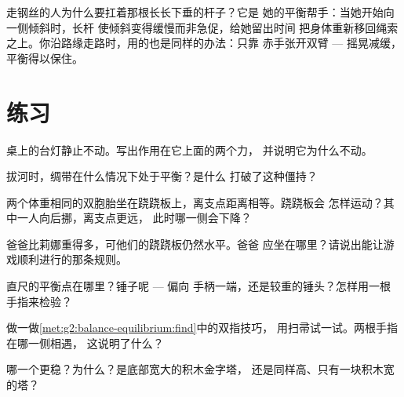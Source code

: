 \begin{example}[走钢丝者的长杆]\label{ex:g2:balance-equilibrium:acrobat}
走钢丝的人为什么要扛着那根长长下垂的杆子？它是
她的平衡帮手：当她开始向一侧倾斜时，长杆
使倾斜变得缓慢而非急促，给她留出时间
把身体重新移回绳索之上。你沿路缘走路时，用的也是同样的办法：只靠
赤手张开双臂 --- 摇晃减缓，
平衡得以保住。
\end{example}

\section{练习}

\begin{exercise}[$\star$]\label{exo:g2:balance-equilibrium:1}
桌上的台灯静止不动。写出作用在它上面的两个力，
并说明它为什么不动。
\end{exercise}

\begin{exercise}[$\star$]\label{exo:g2:balance-equilibrium:2}
拔河时，绸带在什么情况下处于平衡？是什么
打破了这种僵持？
\end{exercise}

\begin{exercise}[$\star$]\label{exo:g2:balance-equilibrium:3}
两个体重相同的双胞胎坐在跷跷板上，离支点距离相等。跷跷板会
怎样运动？其中一人向后挪，离支点更远，
此时哪一侧会下降？
\end{exercise}

\begin{exercise}[$\star$]\label{exo:g2:balance-equilibrium:4}
爸爸比莉娜重得多，可他们的跷跷板仍然水平。爸爸
应坐在哪里？请说出能让游戏顺利进行的那条规则。
\end{exercise}

\begin{exercise}[$\star$]\label{exo:g2:balance-equilibrium:5}
直尺的平衡点在哪里？锤子呢 --- 偏向
手柄一端，还是较重的锤头？怎样用一根
手指来检验？
\end{exercise}

\begin{exercise}[$\star$]\label{exo:g2:balance-equilibrium:6}
做一做\cref{met:g2:balance-equilibrium:find}中的双指技巧，
用扫帚试一试。两根手指在哪一侧相遇，
这说明了什么？
\end{exercise}

\begin{exercise}[$\star$]\label{exo:g2:balance-equilibrium:7}
哪一个更稳？为什么？是底部宽大的积木金字塔，
还是同样高、只有一块积木宽的塔？
\end{exercise}

